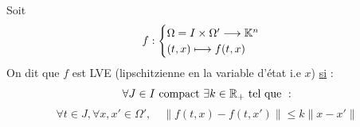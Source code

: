 \begin{definition}
    Soit 
    \[ f : 
        \begin{cases}
            \Omega = I \times \Omega' \longrightarrow \mathbb{K}^n \\ 
            (t,x) \longmapsto f(t,x)
        \end{cases} \] 
    On dit que $f$ est LVE (lipschitzienne en la variable d'état i.e $x$) \underline{si} :
    \[ \forall J \in I \text{ compact } \exists k \in \mathbb{R}_+ \text{ tel que } : \] 
    \[ \forall t \in J, \forall x, x' \in \Omega', \quad \boxed{\| f(t,x) - f(t,x')\| \leqslant k \| x - x' \| } \]  
\end{definition}

